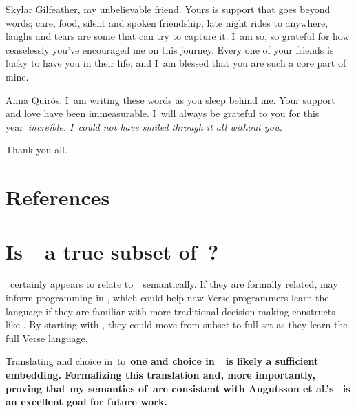 \documentclass[manuscript,screen, 12pt, nonacm]{acmart}
\begin{document}
Skylar Gilfeather, my unbelievable friend. Yours is support that goes
beyond words; care, food, silent and spoken friendship, late night rides to
anywhere, laughs and tears are some that can try to capture it. I~am so, so
grateful for how ceaselessly you've encouraged me on this journey. Every one
of your friends is lucky to have you in their life, and I~am blessed that 
you are such a core part of mine. 

Anna Quirós, I~am writing these words as you sleep behind me. Your support
and love have been immeasurable. I~will always be grateful to you for this
year~\it{increíble}. I~could not have smiled through it all without you. 

Thank you all. 

\section{References}


\renewcommand\thesection{\Alph{section}}
\setcounter{section}{0}


\section{Is~\VMinus\ a true subset of~\VC?}
\VMinus\ certainly appears to relate to~\VC\ semantically. If they are formally
related, \VMinus may inform programming in \VC, which could help new Verse
programmers learn the language if they are familiar with more traditional
decision-making constructs like \iffibf. By starting with \VMinus, they could
move from subset to full set as they learn the full Verse language. 

Translating \iffibf and choice in~\VMinus to~\bf{one} and choice in~\VC\ is
likely a sufficient embedding. Formalizing this translation and, more
importantly, proving that my semantics of~\VMinus are consistent with Augutsson
et al.'s \VC\ is an excellent goal for future work. 
\end{document}
